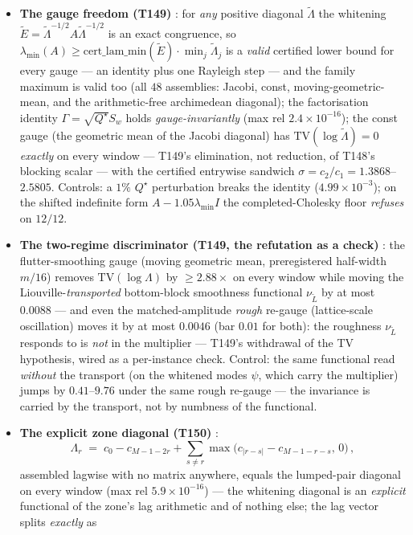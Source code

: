 \documentclass[11pt,a4paper]{article}
\begin{document}
\begin{itemize}[leftmargin=1.5em]
\item \textbf{The gauge freedom (T149)} \mE: for \emph{any} positive diagonal
$\tilde\Lambda$ the whitening $\tilde E=\tilde\Lambda^{-1/2}A\tilde\Lambda^{-1/2}$ is an
exact congruence, so
$\lambda_{\min}(A)\ge\mathrm{cert\_lam\_min}(\tilde E)\cdot\min_j\tilde\Lambda_j$ is a
\emph{valid} certified lower bound for every gauge --- an identity plus one Rayleigh step ---
and the family maximum is valid too (all $48$ assemblies: Jacobi, const, moving-geometric-mean,
and the arithmetic-free archimedean diagonal); the factorisation identity
$\Gamma=\sqrt{Q^\star}S_w$ holds \emph{gauge-invariantly} (max rel $2.4\times10^{-16}$); the
const gauge (the geometric mean of the Jacobi diagonal) has $\mathrm{TV}(\log\tilde\Lambda)=0$
\emph{exactly} on every window --- T149's elimination, not reduction, of T148's blocking scalar
--- with the certified entrywise sandwich $\sigma=c_2/c_1=1.3868$--$2.5805$. Controls: a $1\%$
$Q^\star$ perturbation breaks the identity ($4.99\times10^{-3}$); on the shifted indefinite
form $A-1.05\lambda_{\min}I$ the completed-Cholesky floor \emph{refuses} on $12/12$.
\item \textbf{The two-regime discriminator (T149, the refutation as a check)} \mE: the
flutter-smoothing gauge (moving geometric mean, preregistered half-width $m/16$) removes
$\mathrm{TV}(\log\Lambda)$ by $\ge2.88\times$ on every window while moving the
Liouville-\emph{transported} bottom-block smoothness functional $\nu_{\tilde L}$ by at most
$0.0088$ --- and even the matched-amplitude \emph{rough} re-gauge (lattice-scale oscillation)
moves it by at most $0.0046$ (bar $0.01$ for both): the roughness $\nu_{\tilde L}$ responds to
is \emph{not} in the multiplier --- T149's withdrawal of the TV hypothesis, wired as a
per-instance check. Control: the same functional read \emph{without} the transport (on the
whitened modes $\psi$, which carry the multiplier) jumps by $0.41$--$9.76$ under the same rough
re-gauge --- the invariance is carried by the transport, not by numbness of the functional.
\item \textbf{The explicit zone diagonal (T150)} \mE:
\[
\Lambda_r\;=\;c_0-c_{M-1-2r}+\sum_{s\ne r}\max\bigl(c_{|r-s|}-c_{M-1-r-s},\,0\bigr)\,,
\]
assembled lagwise with no matrix anywhere, equals the lumped-pair diagonal on every window
(max rel $5.9\times10^{-16}$) --- the whitening diagonal is an \emph{explicit} functional of
the zone's lag arithmetic and of nothing else; the lag vector splits \emph{exactly} as

\end{itemize}
\end{document}

